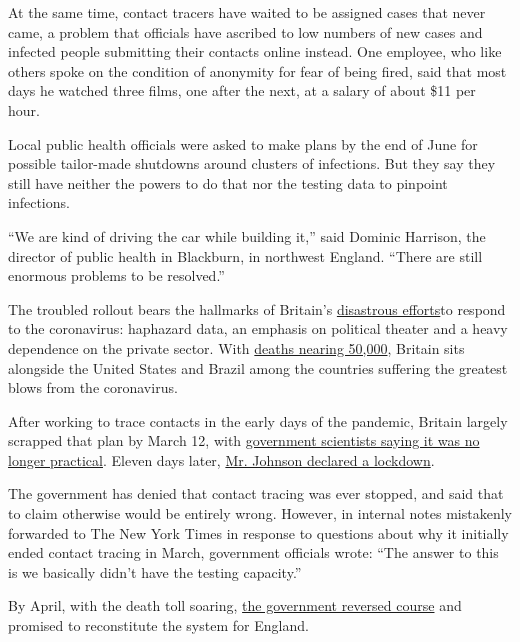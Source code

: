 At the same time, contact tracers have waited to be assigned cases that
never came, a problem that officials have ascribed to low numbers of new
cases and infected people submitting their contacts online instead. One
employee, who like others spoke on the condition of anonymity for fear
of being fired, said that most days he watched three films, one after
the next, at a salary of about \$11 per hour.

Local public health officials were asked to make plans by the end of
June for possible tailor-made shutdowns around clusters of infections.
But they say they still have neither the powers to do that nor the
testing data to pinpoint infections.

``We are kind of driving the car while building it,'' said Dominic
Harrison, the director of public health in Blackburn, in northwest
England. ``There are still enormous problems to be resolved.''

The troubled rollout bears the hallmarks of Britain's
\href{https://www.nytimes3xbfgragh.onion/2020/04/16/world/europe/coronavirus-antibody-test-uk.html}{disastrous
efforts}to respond to the coronavirus: haphazard data, an emphasis on
political theater and a heavy dependence on the private sector. With
\href{https://www.reuters.com/article/us-health-coronavirus-britain-casualties/uk-covid-19-death-toll-tops-47000-as-pressure-heaps-on-pm-johnson-idUSKBN23211E}{deaths
nearing 50,000}, Britain sits alongside the United States and Brazil
among the countries suffering the greatest blows from the coronavirus.

After working to trace contacts in the early days of the pandemic,
Britain largely scrapped that plan by March 12, with
\href{https://assets.publishing.service.gov.uk/government/uploads/system/uploads/attachment_data/file/886989/s0007-spi-m-o-consensus-view-impact-interventions-030220-sage4.pdf}{government
scientists saying it was no longer practical}. Eleven days later,
\href{https://www.nytimes3xbfgragh.onion/2020/03/23/world/europe/coronavirus-uk-boris-johnson.html}{Mr.
Johnson declared a lockdown}.

The government has denied that contact tracing was ever stopped, and
said that to claim otherwise would be entirely wrong. However, in
internal notes mistakenly forwarded to The New York Times in response to
questions about why it initially ended contact tracing in March,
government officials wrote: ``The answer to this is we basically didn't
have the testing capacity.''

By April, with the death toll soaring,
\href{https://www.theguardian.com/world/2020/apr/17/uk-to-start-coronavirus-contact-tracing-again}{the
government reversed course} and promised to reconstitute the system for
England.

